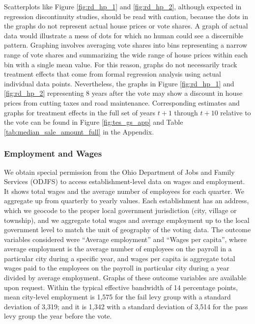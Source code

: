 Scatterplots like Figure \ref{fig:rd_hp_1} and \ref{fig:rd_hp_2}, although expected in regression discontinuity studies, should be read with caution, because the dots in the graphs do not represent actual house prices or vote shares.  A graph of actual data would illustrate a mess of dots for which no human could see a discernible pattern.  Graphing involves averaging vote shares into bins representing a narrow range of vote shares and summarizing the wide range of house prices within each bin with a single mean value.  For this reason, graphs do not necessarily track treatment effects that come from formal regression analysis using actual individual data points.  Nevertheless, the graphs in Figure \ref{fig:rd_hp_1} and \ref{fig:rd_hp_2} representing 8 years after the vote may show a discount in house prices from cutting taxes and road maintenance. Corresponding estimates and graphs for treatment effects in the full set of years $t+1$ through $t+10$ relative to the vote can be found in Figure \ref{fig:tes_gs_app} and Table \ref{tab:median_sale_amount_full} in the Appendix.

\subsubsection{Employment and Wages}

We obtain special permission from the Ohio Department of Jobs and Family Services (ODJFS) to access establishment-level data on wages and employment.  It shows total wages and the average number of employees for each quarter.  We aggregate up from quarterly to yearly values.  Each establishment has an address, which we geocode to the proper local government jurisdiction (city, village or township), and we aggregate total wages and average employment up to the local government level to match the unit of geography of the voting data. The outcome variables considered were “Average employment” and “Wages per capita”, where average employment is the average number of employees on the payroll in a particular city during a specific year, and wages per capita is aggregate total wages paid to the employees on the payroll in particular city during a year divided by average employment. Graphs of these outcome variables are available upon request.  Within the typical effective bandwidth of 14 percentage points, mean city-level employment is 1,575 for the fail levy group with a standard deviation of 3,319; and it is 1,342 with a standard deviation of 3,514 for the pass levy group the year before the vote.  


